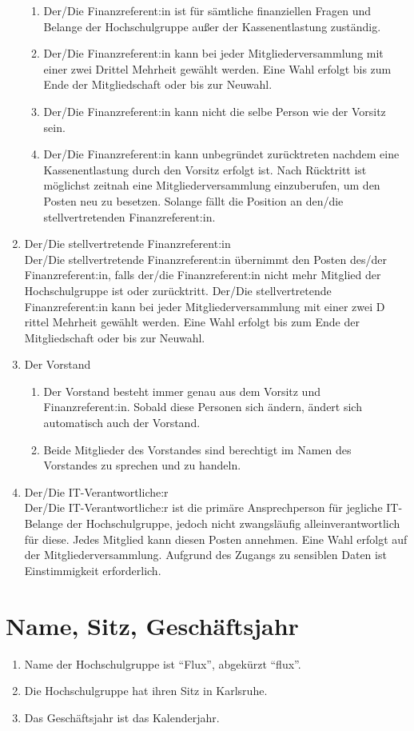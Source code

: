 \documentclass[11pt]{article}
\begin{document}
\begin{enumerate}
\begin{enumerate}
		      \item Der/Die Finanzreferent:in ist für sämtliche finanziellen Fragen und Belange der Hochschulgruppe außer der Kassenentlastung zuständig.
		      \item Der/Die Finanzreferent:in kann bei jeder Mitgliederversammlung mit einer zwei Drittel Mehrheit gewählt werden. Eine Wahl erfolgt bis zum Ende der Mitgliedschaft oder bis zur Neuwahl.
		      \item Der/Die Finanzreferent:in kann nicht die selbe Person wie der Vorsitz sein.
		      \item Der/Die Finanzreferent:in kann unbegründet zurücktreten nachdem eine Kassenentlastung durch den Vorsitz erfolgt ist. Nach Rücktritt ist möglichst zeitnah eine Mitgliederversammlung einzuberufen,  um den Posten neu zu besetzen. Solange fällt die Position an den/die stellvertretenden Finanzreferent:in.
	      \end{enumerate}
	\item Der/Die stellvertretende Finanzreferent:in\\
	      Der/Die stellvertretende Finanzreferent:in übernimmt den Posten des/der Finanzreferent:in, falls der/die Finanzreferent:in nicht mehr Mitglied der Hochschulgruppe ist oder zurücktritt. Der/Die stellvertretende Finanzreferent:in kann bei jeder Mitgliederversammlung mit einer zwei D
	      rittel Mehrheit gewählt werden. Eine Wahl erfolgt bis zum Ende der Mitgliedschaft oder bis zur Neuwahl.
	\item Der Vorstand
	      \begin{enumerate}
		      \item Der Vorstand besteht immer genau aus dem Vorsitz und Finanzreferent:in. Sobald diese Personen sich ändern, ändert sich automatisch auch der Vorstand.
		      \item Beide Mitglieder des Vorstandes sind berechtigt im Namen des Vorstandes zu sprechen und zu handeln.
	      \end{enumerate}
	\item Der/Die IT-Verantwortliche:r\\
	      Der/Die IT-Verantwortliche:r ist die primäre Ansprechperson für jegliche IT-Belange der Hochschulgruppe, jedoch nicht zwangsläufig alleinverantwortlich für diese. Jedes Mitglied kann diesen Posten annehmen. Eine Wahl erfolgt auf der Mitgliederversammlung. Aufgrund des Zugangs zu sensiblen Daten ist Einstimmigkeit erforderlich.
\end{enumerate}
\section{Name, Sitz, Geschäftsjahr}
\begin{enumerate}
	\item Name der Hochschulgruppe ist ``Flux'', abgekürzt ``flux''.
	\item Die Hochschulgruppe hat ihren Sitz in Karlsruhe.
	\item Das Geschäftsjahr ist das Kalenderjahr.
\end{enumerate}
\end{document}
